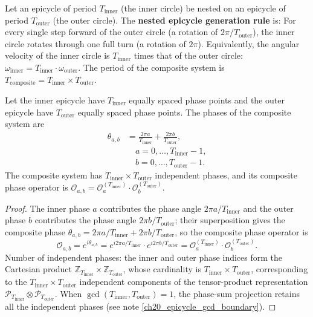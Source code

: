 \begin{definition}\label{def:epicycle_nesting_rule}
Let an epicycle of period $T_{\text{inner}}$ (the inner circle) be nested on an epicycle of period $T_{\text{outer}}$ (the outer circle). The \textbf{nested epicycle generation rule} is:
For every single step forward of the outer circle (a rotation of $2\pi/T_{\text{outer}}$), the inner circle rotates through one full turn (a rotation of $2\pi$).
Equivalently, the angular velocity of the inner circle is $T_{\text{inner}}$ times that of the outer circle: $\omega_{\text{inner}} = T_{\text{inner}} \cdot \omega_{\text{outer}}$. The period of the composite system is $T_{\text{composite}} = T_{\text{inner}} \times T_{\text{outer}}$.
\end{definition}

\begin{theorem}\label{thm:epicycle_nesting_generation}
Let the inner epicycle have $T_{\text{inner}}$ equally spaced phase points and the outer epicycle have $T_{\text{outer}}$ equally spaced phase points. The phases of the composite system are
\[
\begin{aligned}
\theta_{a,b} &= \frac{2\pi a}{T_{\text{inner}}} + \frac{2\pi b}{T_{\text{outer}}},\\
&\quad a = 0, \dots, T_{\text{inner}}-1,\\
&\quad b = 0, \dots, T_{\text{outer}}-1.
\end{aligned}
\]
The composite system has $T_{\text{inner}} \times T_{\text{outer}}$ independent phases, and its composite phase operator is $\mathcal{O}_{a,b} = \mathcal{O}_a^{(T_{\text{inner}})} \cdot \mathcal{O}_b^{(T_{\text{outer}})}$.
\end{theorem}

\begin{proof}
The inner phase $a$ contributes the phase angle $2\pi a/T_{\text{inner}}$ and the outer phase $b$ contributes the phase angle $2\pi b/T_{\text{outer}}$; their superposition gives the composite phase $\theta_{a,b} = 2\pi a/T_{\text{inner}} + 2\pi b/T_{\text{outer}}$, so the composite phase operator is
\[
\mathcal{O}_{a,b} = e^{i\theta_{a,b}} = e^{i2\pi a/T_{\text{inner}}} \cdot e^{i2\pi b/T_{\text{outer}}} = \mathcal{O}_a^{(T_{\text{inner}})} \cdot \mathcal{O}_b^{(T_{\text{outer}})}.
\]
Number of independent phases: the inner and outer phase indices form the Cartesian product $\mathbb{Z}_{T_{\text{inner}}} \times \mathbb{Z}_{T_{\text{outer}}}$, whose cardinality is $T_{\text{inner}} \times T_{\text{outer}}$, corresponding to the $T_{\text{inner}} \times T_{\text{outer}}$ independent components of the tensor-product representation $\mathcal{P}_{T_{\text{inner}}} \otimes \mathcal{P}_{T_{\text{outer}}}$. When $\gcd(T_{\text{inner}}, T_{\text{outer}}) = 1$, the phase-sum projection retains all the independent phases (see note \ref{ch20_epicycle_gcd_boundary}).
\end{proof}

